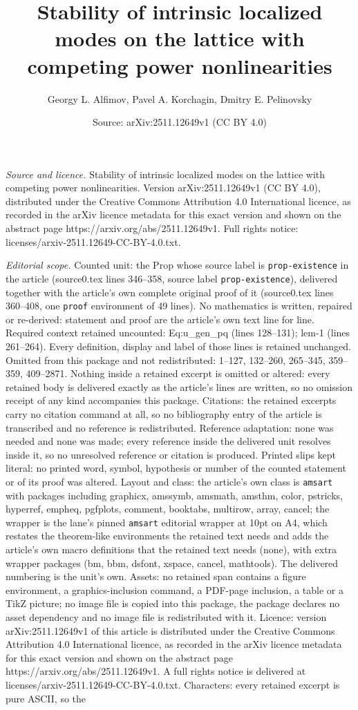\documentclass[10pt,a4paper]{amsart}
\title[Stability of intrinsic localized modes on the lattice with c]{Stability of intrinsic localized modes on the lattice with competing power nonlinearities}
\author{Georgy L. Alfimov, Pavel A. Korchagin, Dmitry E. Pelinovsky}
\date{Source: arXiv:2511.12649v1 (CC BY 4.0)}
\begin{document}
\maketitle

\noindent\emph{Source and licence.} Stability of intrinsic localized modes on the lattice with competing power nonlinearities. Version arXiv:2511.12649v1 (CC BY 4.0), distributed under the Creative Commons Attribution 4.0 International licence, as recorded in the arXiv licence metadata for this exact version and shown on the abstract page https://arxiv.org/abs/2511.12649v1. Full rights notice: licenses/arxiv-2511.12649-CC-BY-4.0.txt.\par\smallskip

\noindent\textit{Editorial scope.} Counted unit: the Prop whose source label is \texttt{prop-existence} in the article (source0.tex lines 346--358, source label \texttt{prop-existence}), delivered together with the article's own complete original proof of it (source0.tex lines 360--408, one \texttt{proof} environment of 49 lines). No mathematics is written, repaired or re-derived: statement and proof are the article's own text line for line. Required context retained uncounted: Eq:u\_gen\_pq (lines 128--131); lem-1 (lines 261--264). Every definition, display and label of those lines is retained unchanged. Omitted from this package and not redistributed: 1--127, 132--260, 265--345, 359--359, 409--2871. Nothing inside a retained excerpt is omitted or altered: every retained body is delivered exactly as the article's lines are written, so no omission receipt of any kind accompanies this package. Citations: the retained excerpts carry no citation command at all, so no bibliography entry of the article is transcribed and no reference is redistributed. Reference adaptation: none was needed and none was made; every reference inside the delivered unit resolves inside it, so no unresolved reference or citation is produced. Printed slips kept literal: no printed word, symbol, hypothesis or number of the counted statement or of its proof was altered. Layout and class: the article's own class is \texttt{amsart} with packages including graphicx, amssymb, amsmath, amsthm, color, pstricks, hyperref, empheq, pgfplots, comment, booktabs, multirow, array, cancel; the wrapper is the lane's pinned \texttt{amsart} editorial wrapper at 10pt on A4, which restates the theorem-like environments the retained text needs and adds the article's own macro definitions that the retained text needs (none), with extra wrapper packages (bm, bbm, dsfont, xspace, cancel, mathtools). The delivered numbering is the unit's own. Assets: no retained span contains a figure environment, a graphics-inclusion command, a PDF-page inclusion, a table or a TikZ picture; no image file is copied into this package, the package declares no asset dependency and no image file is redistributed with it. Licence: version arXiv:2511.12649v1 of this article is distributed under the Creative Commons Attribution 4.0 International licence, as recorded in the arXiv licence metadata for this exact version and shown on the abstract page https://arxiv.org/abs/2511.12649v1. A full rights notice is delivered at licenses/arxiv-2511.12649-CC-BY-4.0.txt. Characters: every retained excerpt is pure ASCII, so the 
\end{document}
